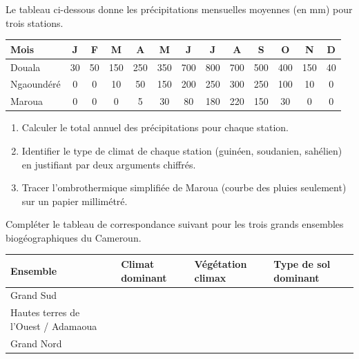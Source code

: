 \documentclass[11pt]{article}
\newcounter{popsec}
\newcounter{popsub}
\newcommand{\courssub}[1]{%
  \stepcounter{popsub}%
  \par\vspace{9pt}\noindent{\popxbold\fontsize{11.5}{13}\selectfont\color{popink}{\color{poporange}\thepopsec.\thepopsub}\hspace{6pt}#1}\par\nopagebreak\vspace{4pt}
}
\begin{document}
\courssub{Je m'entraîne}

\begin{exercice}
Le tableau ci-dessous donne les précipitations mensuelles moyennes (en mm) pour trois stations.
\begin{center}
\begin{tabular}{|l|*{12}{c|}}\hline
Mois & J & F & M & A & M & J & J & A & S & O & N & D \\ \hline
Douala & 30 & 50 & 150 & 250 & 350 & 700 & 800 & 700 & 500 & 400 & 150 & 40 \\ \hline
Ngaoundéré & 0 & 0 & 10 & 50 & 150 & 200 & 250 & 300 & 250 & 100 & 10 & 0 \\ \hline
Maroua & 0 & 0 & 0 & 5 & 30 & 80 & 180 & 220 & 150 & 30 & 0 & 0 \\ \hline
\end{tabular}
\end{center}
\begin{enumerate}
\item Calculer le total annuel des précipitations pour chaque station.
\item Identifier le type de climat de chaque station (guinéen, soudanien, sahélien) en justifiant par deux arguments chiffrés.
\item Tracer l'ombrothermique simplifiée de Maroua (courbe des pluies seulement) sur un papier millimétré.
\end{enumerate}
\end{exercice}

\begin{exercice}
Compléter le tableau de correspondance suivant pour les trois grands ensembles biogéographiques du Cameroun.
\begin{center}
\begin{tabularx}{\linewidth}{|l|X|X|X|}\hline
\textbf{Ensemble} & \textbf{Climat dominant} & \textbf{Végétation climax} & \textbf{Type de sol dominant} \\ \hline
Grand Sud &  &  &  \\ \hline
Hautes terres de l'Ouest / Adamaoua &  &  &  \\ \hline
Grand Nord &  &  &  \\ \hline
\end{tabularx}
\end{center}
\end{exercice}
\end{document}
